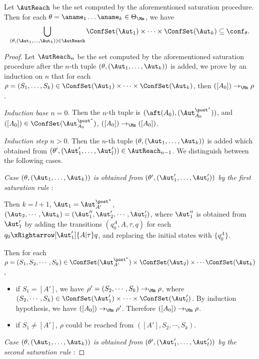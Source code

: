 \begin{lemma}
    Let $\AutReach$ be the set computed by the aforementioned saturation procedure. Then for each $\theta = \aname_1 \dots \aname_k \in \Theta_\Mm$, we have 
    $$\bigcup \limits_{(\theta, (\Aut_1, \dots, \Aut_k)) \in \AutReach} \ConfSet(\Aut_1) \times \dots \times \ConfSet(\Aut_k) \subseteq \conf_\theta.$$

\end{lemma}

\begin{proof}
    Let $\AutReach_n$ be the set computed by the aforementioned saturation procedure after the $n$-th tuple $(\theta,(\Aut_1,\dots,\Aut_k))$ is added, we prove by an induction on $n$ that for each $\rho = (S_1,\dots,S_k)\in\ConfSet(\Aut_1) \times \dots \times \ConfSet(\Aut_k)$, then $([A_0])\rightarrow_{\Mm}\rho$.

    \noindent \emph{Induction base $n = 0$}. Then the $n$-th tuple is $(\aft(A_0),(\Aut_{A_0}^{\post^*}))$, and $([A_0]) \in \ConfSet(\Aut_{A_0}^{\post^*})$, $([A_0])\rightarrow_{\Mm}([A_0])$.

\smallskip

\noindent \emph{Induction step $n > 0$}. Then the $n$-th tuple $(\theta,(\Aut_1,\dots,\Aut_k))$ is added which obtained from $(\theta',(\Aut_1',\dots,\Aut_l'))\in\AutReach_{n-1}$.
We distinguish between the following cases.

\noindent \emph{Case $(\theta,(\Aut_1,\dots,\Aut_k))$ is obtained from $(\theta',(\Aut_1',\dots,\Aut_l'))$ by the first saturation rule} :

Then $k = l+1$, $\Aut_1 = \Aut_{A'}^{\post^*}$, $(\Aut_2,\cdots,\Aut_k) = (\Aut_1'',\Aut_2',\cdots,\Aut_l')$, where $\Aut_1''$ is obtained from $\Aut_1'$ by 
adding the transitions $(q_0^{A},A,\tau,q)$ for each $q_0\xRightarrow[\Aut_1']{A | \tau} q$, and replacing the initial states with $\{q_0^{A}\}$.

Then for each $\rho=(S_1,S_2,\cdots,S_k)\in\ConfSet(\Aut_{A'}^{\post^*})\times\ConfSet(\Aut_2)\times\cdots\ConfSet(\Aut_k)$,
\begin{itemize}
    \item if $S_1=[A']$, we have $\rho' = (S_2,\cdots,S_k)\rightarrow_{\Mm}\rho$, where $(S_2,\cdots,S_k)\in\ConfSet(\Aut_1')\times\cdots\times\ConfSet(\Aut_l')$.  By induction hypothesis, we have $([A_0])\rightarrow_{\Mm} \rho'$. Therefore $([A_0])\rightarrow_{\Mm}\rho$.
    \item if $S_1\neq[A']$, $\rho$ could be reached from $([A'],S_2,\cdots,S_k)$.
\end{itemize}
\noindent \emph{Case $(\theta,(\Aut_1,\dots,\Aut_k))$ is obtained from $(\theta',(\Aut_1',\dots,\Aut_l'))$ by the second saturation rule} :


\end{proof}
